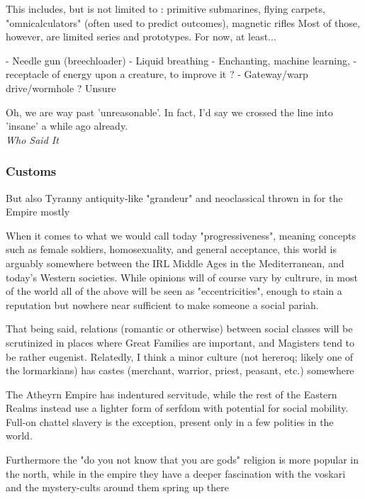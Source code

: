 This includes, but is not limited to : primitive submarines, flying carpets, "omnicalculators" (often used to predict outcomes), magnetic rifles
Most of those, however, are limited series and prototypes. For now, at least...


- Needle gun (breechloader)
- Liquid breathing
- Enchanting, machine learning, 
- receptacle of energy upon a creature, to improve it ?
- Gateway/warp drive/wormhole ? Unsure



\begin{rpg-quotebox}
    Oh, we are way past 'unreasonable'. In fact, I'd say we crossed the line into 'insane' a while ago already. \\ \textendash \textit{Who Said It}
\end{rpg-quotebox}


\subsubsection{Customs}

But also Tyranny antiquity-like "grandeur" and neoclassical thrown in for the Empire mostly

When it comes to what we would call today "progressiveness", meaning concepts such as female soldiers, homosexuality, and general acceptance, this world is arguably somewhere between the IRL Middle Ages in the Mediterranean, and today's Western societies. While opinions will of course vary by cultrure, in most of the world all of the above will be seen as "eccentricities", enough to stain a reputation but nowhere near sufficient to make someone a social pariah.

That being said, relations (romantic or otherwise) between social classes will be scrutinized in places where Great Families are important, and Magisters tend to be rather eugenist. 
Relatedly, I think a minor culture (not hereroq; likely one of the lormarkians) has castes (merchant, warrior, priest, peasant, etc.) somewhere

The Atheyrn Empire has indentured servitude, while the rest of the Eastern Realms instead use a lighter form of serfdom with potential for social mobility. Full-on chattel slavery is the exception, present only in a few polities in the world.

Furthermore the "do you not know that you are gods" religion is more popular in the north, while in the empire they have a deeper fascination with the voskari and the mystery-cults around them spring up there




